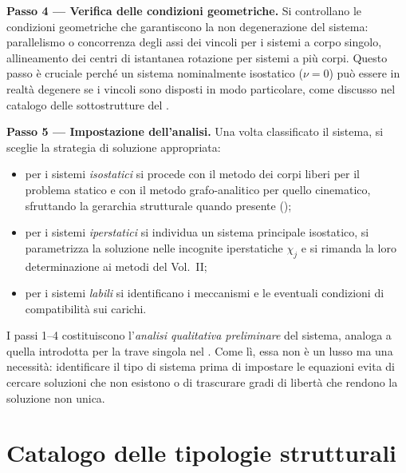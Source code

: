 \medskip
\noindent\textbf{Passo 4 — Verifica delle condizioni
	geometriche.}
Si controllano le condizioni geometriche che garantiscono
la non degenerazione del sistema: parallelismo o
concorrenza degli assi dei vincoli per i sistemi a
corpo singolo, allineamento dei centri di istantanea
rotazione per sistemi a più corpi. Questo passo è
cruciale perché un sistema nominalmente isostatico
($\nu = 0$) può essere in realtà degenere se i vincoli
sono disposti in modo particolare, come discusso nel
catalogo delle sottostrutture del
.

\medskip
\noindent\textbf{Passo 5 — Impostazione dell'analisi.}
Una volta classificato il sistema, si sceglie la
strategia di soluzione appropriata:
\begin{itemize}[noitemsep]
	\item per i sistemi \emph{isostatici} si procede
	con il metodo dei corpi liberi per il problema
	statico e con il metodo grafo-analitico per
	quello cinematico, sfruttando la gerarchia
	strutturale quando presente
	();
	\item per i sistemi \emph{iperstatici} si
	individua un sistema principale isostatico,
	si parametrizza la soluzione nelle incognite
	iperstatiche $\chi_j$ e si rimanda la loro
	determinazione ai metodi del Vol.~II;
	\item per i sistemi \emph{labili} si identificano
	i meccanismi e le eventuali condizioni di
	compatibilità sui carichi.
\end{itemize}

\begin{oss}
	I passi 1--4 costituiscono l'\emph{analisi
		qualitativa preliminare} del sistema, analoga
	a quella introdotta per la trave singola nel
	. Come lì, essa non è
	un lusso ma una necessità: identificare il tipo
	di sistema prima di impostare le equazioni evita
	di cercare soluzioni che non esistono o di
	trascurare gradi di libertà che rendono la
	soluzione non unica.
\end{oss}


\section{Catalogo delle tipologie strutturali}
\label{sec:catalogo}

